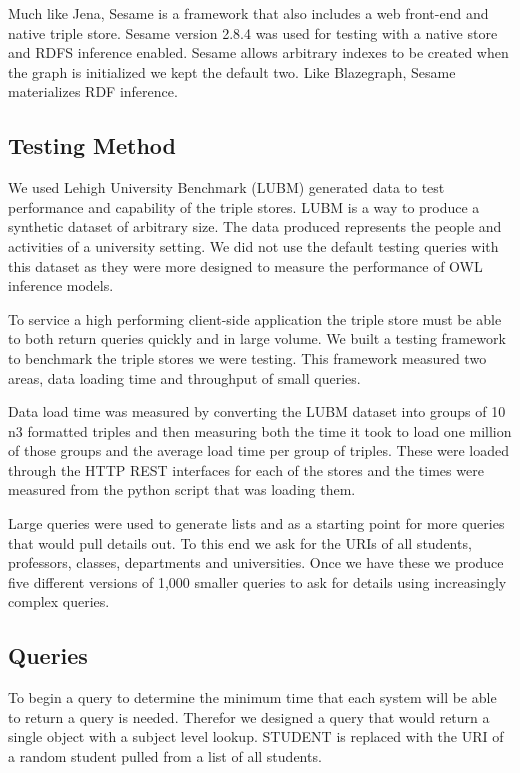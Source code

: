 \documentclass{llncs}
\begin{document}
Much like Jena, Sesame is a framework that also includes a web front-end and native triple store.  Sesame version 2.8.4 was used for testing with a native store and RDFS inference enabled.  Sesame allows arbitrary indexes to be created when the graph is initialized we kept the default two.  Like Blazegraph, Sesame materializes RDF inference.

\subsection{Testing Method}
We used Lehigh University Benchmark (LUBM) \cite{Guo2005} generated data to test performance and capability of the triple stores. LUBM is a way to produce a synthetic dataset of arbitrary size.  The data produced represents the people and activities of a university setting.  We did not use the default testing queries with this dataset as they were more designed to measure the performance of OWL inference models.

To service a high performing client-side application the triple store must be able to both return queries quickly and in large volume.  We built a testing framework to benchmark the triple stores we were testing.  This framework measured two areas, data loading time and throughput of small queries.

Data load time was measured by converting the LUBM dataset into groups of 10 n3 formatted triples and then measuring both the time it took to load one million of those groups and the average load time per group of triples.  These were loaded through the HTTP REST interfaces for each of the stores and the times were measured from the python script that was loading them.

Large queries were used to generate lists and as a starting point for more queries that would pull details out.  To this end we ask for the URIs of all students, professors, classes, departments and universities.  Once we have these we produce five different versions of 1,000 smaller queries to ask for details using increasingly complex queries.

\subsection{Queries}
To begin a query to determine the minimum time that each system will be able to return a query is needed.  Therefor we designed a query that would return a single object with a subject level lookup.  STUDENT is replaced with the URI of a random student pulled from a list of all students.
\end{document}
